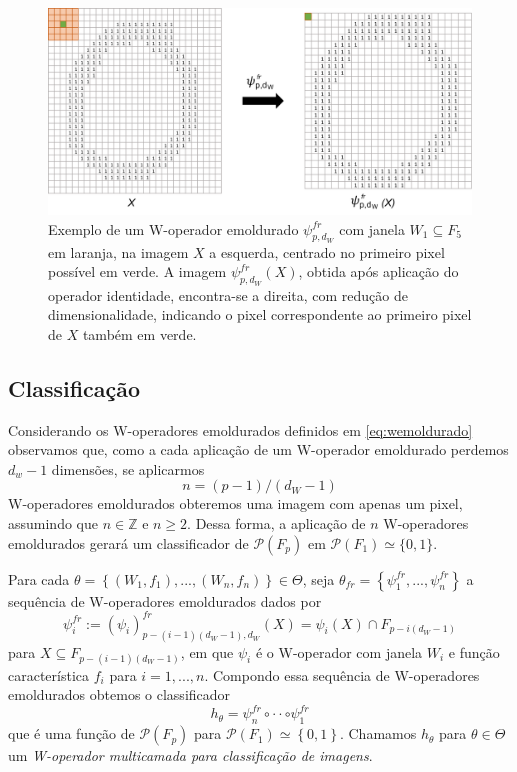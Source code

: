 \begin{figure}
    \centering
    \includegraphics[scale = 0.5]{figuras/digito0_janela1_framed.png}
    \caption{Exemplo de um W-operador emoldurado $ \psi_{p,d_{W}}^{fr}$ com janela $W_{1} \subseteq F_{5}$ em laranja, na imagem $X$ a esquerda, centrado no primeiro pixel possível em verde. A imagem $ \psi_{p,d_{W}}^{fr} \left( X \right)$, obtida após aplicação do operador identidade, encontra-se a direita, com redução de dimensionalidade, indicando o pixel correspondente ao primeiro pixel de $X$ também em verde.}
    \label{fig:dig0jan1}
\end{figure}

\subsection{Classificação}

Considerando os W-operadores emoldurados definidos em \eqref{eq:wemoldurado} observamos que, como a cada aplicação de um W-operador emoldurado perdemos $d_{w} - 1$ dimensões, se aplicarmos
$$n = \left( p - 1 \right) / \left( d_{W} - 1 \right)$$
W-operadores emoldurados obteremos uma imagem com apenas um pixel, assumindo que $n \in \mathbb{Z}$ e $n \geq 2$. Dessa forma, a aplicação de $n$ W-operadores emoldurados gerará um classificador de $\mathcal{P}(F_{p})$ em $\mathcal{P}(F_{1}) \simeq \{0,1\}$.

Para cada $ \theta = \left\{ \left(W_{1}, f_{1} \right), ..., \left(W_{n}, f_{n} \right) \right\} 
\in \Theta $, seja $ \theta_{fr} = \left\{ \psi_{1}^{fr},..., \psi_{n}^{fr} \right\}$ a sequência de W-operadores emoldurados dados por
$$\psi_{i}^{fr}:= \left( \psi_{i} \right)_{p-(i-1)(d_{W}-1),d_{W}}^{fr} \left( X \right) = \psi_{i} \left(X \right) \cap F_{p-i(d_{W}-1)} $$
para $X \subseteq F_{p-(i-1)(d_{W}-1)}$, em que $\psi_{i}$ é o W-operador com janela $W_{i}$ e função característica $f_{i}$ para $i=1,...,n$. Compondo essa sequência de W-operadores emoldurados obtemos o classificador
\begin{equation}
    \label{eq:emolduradas}
    h_{\theta} = \psi_{n}^{fr} \circ \cdot \cdot \circ \psi_{1}^{fr} 
\end{equation}
que é uma função de $\mathcal{P}\left(F_{p} \right) $ para $\mathcal{P}\left(F_{1} \right) \simeq \left\{ 0,1 \right\}$. Chamamos $h_{\theta}$ para $\theta \in \Theta$ um \textit{W-operador multicamada para classificação de imagens}.

